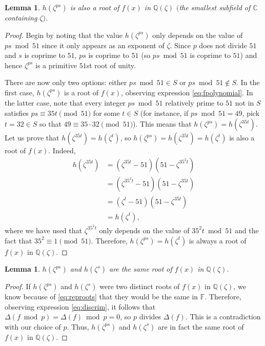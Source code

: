 \documentclass[a4paper, 12pt]{article}
\newtheorem{lemma}[theorem]{Lemma}
\theoremstyle{definition}
\newcommand{\Q}{\ensuremath{\mathbb{Q}}}
\newcommand{\C}{\ensuremath{\mathbb{C}}}
\newcommand{\F}{\ensuremath{\mathbb{F}}}
\begin{document}
\begin{lemma}
$h(\zeta^{ps})$ is also a root of $f(x)$ in $\Q(\zeta)$ $($the smallest subfield of $\C$ containing $\zeta)$.
\end{lemma}
\begin{proof}
Begin by noting that the value $h(\zeta^{ps})$ only depends on the value of $ps \bmod{51}$ since it only appears as an exponent of $\zeta$. Since $p$ does not divide $51$ and $s$ is coprime to $51$, $ps$ is coprime to $51$ (so $ps \bmod{51}$ is coprime to $51$) and hence $\zeta^{ps}$ is a primitive $51$st root of unity.

There are now only two options: either $ps \bmod{51}\in S$ or $ps \bmod{51}\notin S$. In the first case, $h(\zeta^{ps})$ is a root of $f(x)$, observing expression \eqref{eq:fpolynomial}. In the latter case, note that every integer $ps \bmod{51}$ relatively prime to $51$ not in $S$ satisfies $ps\equiv 35t\pmod{51}$ for some $t\in S$ (for instance, if $ps \bmod{51}=49$, pick $t=32\in S$ so that $49\equiv 35\cdot32 \pmod{51}$). This means that $h(\zeta^{ps})=h(\zeta^{35t})$. Let us prove that $h(\zeta^{35t})=h(\zeta^{t})$, so $h(\zeta^{ps})=h(\zeta^{35t})=h(\zeta^{t})$ is also a root of $f(x)$. Indeed,
\begin{align*}
h(\zeta^{35t})&=(\zeta^{35t}-51)(51-\zeta^{35^2t})\\
&=(\zeta^{35^2t}-51)(51-\zeta^{35t})\\
&=(\zeta^{t}-51)(51-\zeta^{35t})\\
&=h(\zeta^{t}),
\end{align*}
where we have used that $\zeta^{35^2t}$ only depends on the value of $35^2t \bmod{51}$ and the fact that $35^2\equiv 1\pmod{51}$. Therefore, $h(\zeta^{ps})=h(\zeta^{t})$ is always a root of $f(x)$ in $\Q(\zeta)$.
\end{proof}

\begin{lemma}
$h(\zeta^{ps})$ and $h(\zeta^{s})$ are the same root of $f(x)$ in $\Q(\zeta)$.
\end{lemma}
\begin{proof}
If $h(\zeta^{ps})$ and $h(\zeta^{s})$ were two distinct roots of $f(x)$ in $\Q(\zeta)$, we know because of \eqref{eq:reproots} that they would be the same in $\F$. Therefore, observing expression \eqref{eq:discrim}, it follows that $\Delta(f \bmod{p})=\Delta(f) \bmod{p}=0$, so $p$ divides $\Delta(f)$. This is a contradiction with our choice of $p$. Thus, $h(\zeta^{ps})$ and $h(\zeta^{s})$ are in fact the same root of $f(x)$ in $\Q(\zeta)$.
\end{proof}
\end{document}
